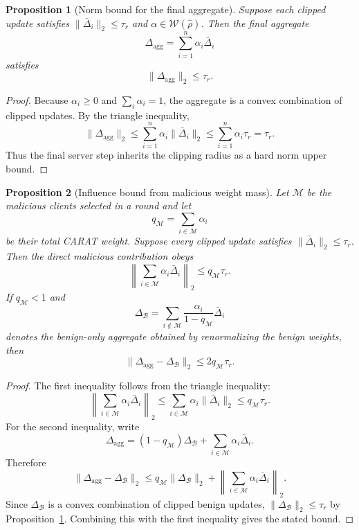 \documentclass{article}
\newtheorem{proposition}{Proposition}[section]
\begin{document}
\begin{proposition}[Norm bound for the final aggregate]
\label{prop:aggregate-bound}
Suppose each clipped update satisfies $\|\bar{\Delta}_i\|_2 \le \tau_r$ and $\alpha \in \mathcal{W}(\hat{\rho})$. Then the final aggregate
\[
\Delta_{\mathrm{agg}}=\sum_{i=1}^n \alpha_i \bar{\Delta}_i
\]
satisfies
\[
\|\Delta_{\mathrm{agg}}\|_2 \le \tau_r.
\]
\end{proposition}

\begin{proof}
Because $\alpha_i \ge 0$ and $\sum_i \alpha_i=1$, the aggregate is a convex combination of clipped updates. By the triangle inequality,
\[
\|\Delta_{\mathrm{agg}}\|_2
\le
\sum_{i=1}^n \alpha_i \|\bar{\Delta}_i\|_2
\le
\sum_{i=1}^n \alpha_i \tau_r
=
\tau_r.
\]
Thus the final server step inherits the clipping radius as a hard norm upper bound.
\end{proof}

\begin{proposition}[Influence bound from malicious weight mass]
\label{prop:malicious-mass-bound}
Let $\mathcal{M}$ be the malicious clients selected in a round and let
\[
q_{\mathcal{M}}=\sum_{i\in\mathcal{M}}\alpha_i
\]
be their total CARAT weight. Suppose every clipped update satisfies $\|\bar{\Delta}_i\|_2\le\tau_r$. Then the direct malicious contribution obeys
\[
\left\|\sum_{i\in\mathcal{M}}\alpha_i\bar{\Delta}_i\right\|_2
\le q_{\mathcal{M}}\tau_r.
\]
If $q_{\mathcal{M}}<1$ and
\[
\Delta_{\mathcal{B}}=
\sum_{i\notin\mathcal{M}}\frac{\alpha_i}{1-q_{\mathcal{M}}}\bar{\Delta}_i
\]
denotes the benign-only aggregate obtained by renormalizing the benign weights, then
\[
\|\Delta_{\mathrm{agg}}-\Delta_{\mathcal{B}}\|_2
\le 2q_{\mathcal{M}}\tau_r.
\]
\end{proposition}

\begin{proof}
The first inequality follows from the triangle inequality:
\[
\left\|\sum_{i\in\mathcal{M}}\alpha_i\bar{\Delta}_i\right\|_2
\le
\sum_{i\in\mathcal{M}}\alpha_i\|\bar{\Delta}_i\|_2
\le q_{\mathcal{M}}\tau_r.
\]
For the second inequality, write
\[
\Delta_{\mathrm{agg}}=
(1-q_{\mathcal{M}})\Delta_{\mathcal{B}}
+\sum_{i\in\mathcal{M}}\alpha_i\bar{\Delta}_i.
\]
Therefore
\[
\|\Delta_{\mathrm{agg}}-\Delta_{\mathcal{B}}\|_2
\le
q_{\mathcal{M}}\|\Delta_{\mathcal{B}}\|_2
+\left\|\sum_{i\in\mathcal{M}}\alpha_i\bar{\Delta}_i\right\|_2.
\]
Since $\Delta_{\mathcal{B}}$ is a convex combination of clipped benign updates, $\|\Delta_{\mathcal{B}}\|_2\le\tau_r$ by Proposition~\ref{prop:aggregate-bound}. Combining this with the first inequality gives the stated bound.
\end{proof}
\end{document}

